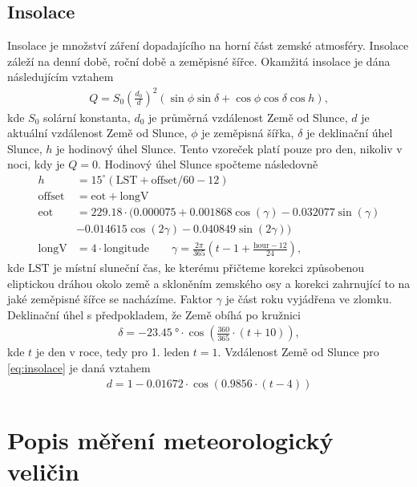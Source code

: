 \subsection{Insolace}\label{chap:insolation}
Insolace je množství záření dopadajícího na horní část zemské atmosféry. Insolace záleží na denní době, roční době a zeměpisné šířce. Okamžitá insolace je dána následujícím vztahem\cite{insolace}
\begin{gather}\label{eq:insolace}
Q = S_0\left(\frac{d_0}{d}\right)^2\left(\sin\phi\sin\delta + \cos\phi\cos\delta\cos h\right),
\end{gather}
kde $S_0$ solární konstanta, $d_0$ je průměrná vzdálenost Země od Slunce, $d$ je aktuální vzdálenost Země od Slunce, $\phi$ je zeměpisná šířka, $\delta$ je deklinační úhel Slunce, $h$ je hodinový úhel Slunce. Tento vzoreček platí pouze pro den, nikoliv v noci, kdy je $Q=0$. Hodinový úhel Slunce spočteme následovně\cite{hourangle}
\begin{equation}
	\begin{split}
		h &= 15^{\circ}\left(\text{LST}+\text{offset}/60-12\right)\\
		\text{offset} &= \text{eot} + \text{longV}\\
		\text{eot} &= 229.18\cdot(0.000075+0.001868\cos(\gamma)-0.032077\sin(\gamma)\\
		& -0.014615\cos(2\gamma)-0.040849\sin(2\gamma))\\
		\text{longV} &= 4\cdot\text{longitude}\qquad \gamma = \frac{2\pi}{365}\left(t - 1 + \frac{\text{hour}-12}{24}\right),
	\end{split}
\end{equation}
kde $\text{LST}$ je místní sluneční čas, ke kterému přičteme korekci způsobenou eliptickou dráhou okolo země a skloněním zemského osy a korekci zahrnující to na jaké zeměpisné šířce se nacházíme. Faktor $\gamma$ je část roku vyjádřena ve zlomku.
Deklinační úhel s předpokladem, že Země obíhá po kružnici\cite{declinationangle}
\begin{gather*}
\delta = \SI{-23.45}{\degree} \cdot \cos\left(\frac{360}{365}\cdot(t+10)\right),
\end{gather*}
kde $t$ je den v roce, tedy pro 1. leden $t=1$. Vzdálenost Země od Slunce pro \eqref{eq:insolace} je daná vztahem\cite{sunearthdist}
\begin{gather*}
d = 1-0.01672\cdot \cos\left(0.9856\cdot(t-4)\right)
\end{gather*}


\section{Popis měření meteorologický veličin} \label{chap:measure}
